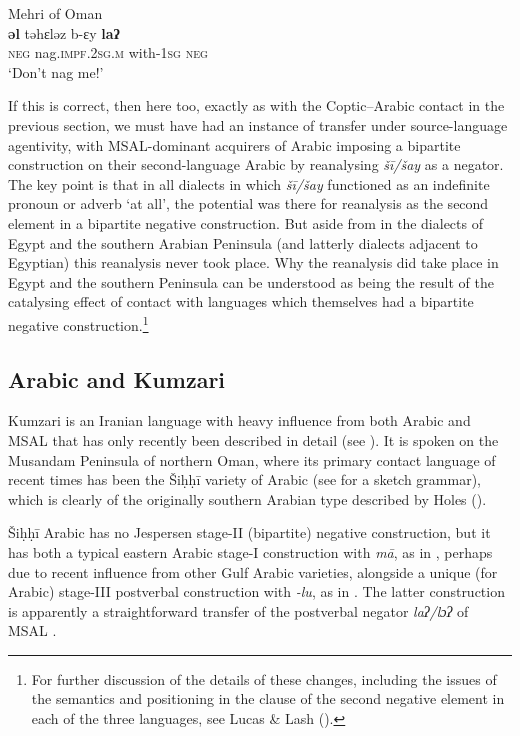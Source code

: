 \documentclass[output=paper]{langsci/langscibook}
\begin{document}
\ea\label{meh1}
{       Mehri of Oman \citep[23]{Johnstone1987}}\\
\gll \textbf{əl} təhɛləz b-ɛy \textbf{laʔ}\\
     \textsc{neg} nag.\textsc{impf.2sg.m} with-\textsc{1sg} \textsc{neg} \\
\glt ‘Don’t nag me!’
\z

If this is correct, then here too, exactly as with the Coptic–Arabic contact in the previous section, we must have had an instance of transfer under source-language agentivity, with MSAL-dominant acquirers of Arabic imposing a bipartite construction on their second-language Arabic by reanalysing \textit{šī/šay} as a negator. The key point is that in all dialects in which \textit{šī/šay} functioned as an indefinite pronoun or adverb ‘at all’, the potential was there for reanalysis as the second element in a bipartite negative construction. But aside from in the dialects of Egypt and the southern Arabian Peninsula (and latterly dialects adjacent to Egyptian) this reanalysis never took place. Why the reanalysis did take place in Egypt and the southern Peninsula can be understood as being the result of the catalysing effect of contact with languages which themselves had a bipartite negative construction.\footnote{For further discussion of the details of these changes, including the issues of the semantics and positioning in the clause of the second negative element in each of the three languages, see Lucas \& Lash (\citeyear[395–401]{LucasLash2010}).}



\subsection{Arabic and Kumzari}\label{sec:key:kumz}


Kumzari is an Iranian language with heavy influence from both Arabic and MSAL that has only recently been described in detail (see \citealt{WalAnonbyforthcoming}). It is spoken on the Musandam Peninsula of northern Oman, where its primary contact language of recent times has been the Šiḥḥī variety of Arabic (see \citealt{Bernabela2011} for a sketch grammar), which is clearly of the originally southern Arabian type described by Holes (\citeyear[18–32]{Holes2016}).

Šiḥḥī Arabic has no Jespersen stage-II (bipartite) negative construction, but it has both a typical eastern Arabic stage-I construction with \textit{mā}, as in , perhaps due to recent influence from other Gulf Arabic varieties, alongside a unique (for Arabic) stage-III postverbal construction with \textit{{}-lu}, as in . The latter construction is apparently a straightforward transfer of the postverbal negator \textit{laʔ/lɔʔ} of MSAL . 
\end{document}
